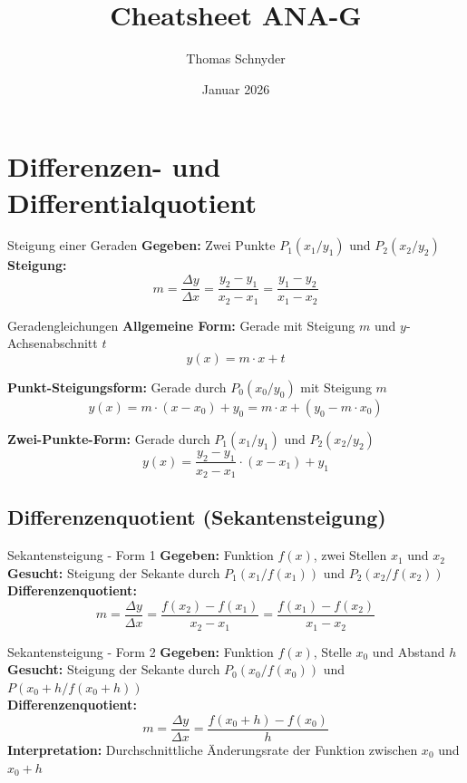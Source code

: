 \documentclass[a4paper,fontsize = 7pt]{scrartcl}
\title{Cheatsheet ANA-G}
\author{Thomas Schnyder}
\date{Januar 2026}
\begin{document}
\maketitle

\section{Differenzen- und Differentialquotient}

\begin{subbox}{Steigung einer Geraden}
	\textbf{Gegeben:} Zwei Punkte $P_1(x_1/y_1)$ und $P_2(x_2/y_2)$ \\
	\textbf{Steigung:}
	$$m = \frac{\Delta y}{\Delta x} = \frac{y_2 - y_1}{x_2 - x_1} = \frac{y_1 - y_2}{x_1 - x_2}$$
\end{subbox}

\begin{mainbox}{Geradengleichungen}
\textbf{Allgemeine Form:} Gerade mit Steigung $m$ und $y$-Achsenabschnitt $t$
$$y(x) = m \cdot x + t$$

\textbf{Punkt-Steigungsform:} Gerade durch $P_0(x_0/y_0)$ mit Steigung $m$
$$y(x) = m \cdot (x - x_0) + y_0 = m \cdot x + (y_0 - m \cdot x_0)$$

\textbf{Zwei-Punkte-Form:} Gerade durch $P_1(x_1/y_1)$ und $P_2(x_2/y_2)$
	$$y(x) = \frac{y_2 - y_1}{x_2 - x_1} \cdot (x - x_1) + y_1$$
\end{mainbox}

\subsection{Differenzenquotient (Sekantensteigung)}

\begin{mainbox}{Sekantensteigung - Form 1}
	\textbf{Gegeben:} Funktion $f(x)$, zwei Stellen $x_1$ und $x_2$ \\
	\textbf{Gesucht:} Steigung der Sekante durch $P_1(x_1/f(x_1))$ und $P_2(x_2/f(x_2))$ \\
	\textbf{Differenzenquotient:}
	$$m = \frac{\Delta y}{\Delta x} = \frac{f(x_2) - f(x_1)}{x_2 - x_1} = \frac{f(x_1) - f(x_2)}{x_1 - x_2}$$
\end{mainbox}

\begin{mainbox}{Sekantensteigung - Form 2}
	\textbf{Gegeben:} Funktion $f(x)$, Stelle $x_0$ und Abstand $h$ \\
	\textbf{Gesucht:} Steigung der Sekante durch $P_0(x_0/f(x_0))$ und $P(x_0+h/f(x_0+h))$ \\
	\textbf{Differenzenquotient:}
	$$m = \frac{\Delta y}{\Delta x} = \frac{f(x_0 + h) - f(x_0)}{h}$$
	\textbf{Interpretation:} Durchschnittliche Änderungsrate der Funktion zwischen $x_0$ und $x_0 + h$
\end{mainbox}
\end{document}
